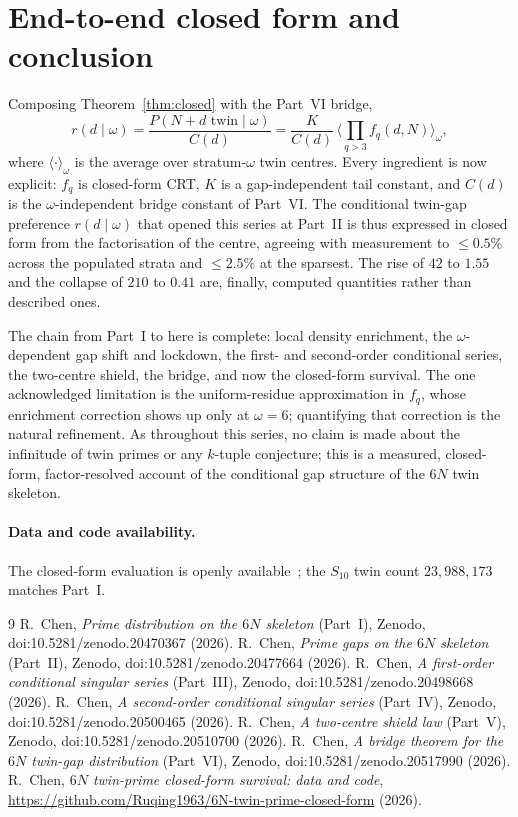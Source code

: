 \documentclass[11pt]{article}
\begin{document}
\section{End-to-end closed form and conclusion}

Composing Theorem~\ref{thm:closed} with the Part~VI bridge,
\[
  r(d\mid\omega)=\frac{P(N{+}d\text{ twin}\mid\omega)}{C(d)}
   =\frac{K}{C(d)}\,\Big\langle\textstyle\prod_{q>3} f_q(d,N)\Big\rangle_{\omega},
\]
where $\langle\cdot\rangle_\omega$ is the average over stratum-$\omega$ twin
centres. Every ingredient is now explicit: $f_q$ is closed-form CRT, $K$ is a
gap-independent tail constant, and $C(d)$ is the $\omega$-independent bridge
constant of Part~VI. The conditional twin-gap preference $r(d\mid\omega)$ that
opened this series at Part~II is thus expressed in closed form from the
factorisation of the centre, agreeing with measurement to $\leq0.5\%$ across the
populated strata and $\leq2.5\%$ at the sparsest. The rise of $42$ to $1.55$ and
the collapse of $210$ to $0.41$ are, finally, computed quantities rather than
described ones.

The chain from Part~I to here is complete: local density enrichment, the
$\omega$-dependent gap shift and lockdown, the first- and second-order
conditional series, the two-centre shield, the bridge, and now the closed-form
survival. The one acknowledged limitation is the uniform-residue approximation in
$f_q$, whose enrichment correction shows up only at $\omega=6$; quantifying that
correction is the natural refinement. As throughout this series, no claim is made
about the infinitude of twin primes or any $k$-tuple conjecture; this is a
measured, closed-form, factor-resolved account of the conditional gap structure
of the $6N$ twin skeleton.

\paragraph{Data and code availability.}
The closed-form evaluation is openly available~\cite{repo}; the $S_{10}$ twin
count $23{,}988{,}173$ matches Part~I.

\begin{thebibliography}{9}
 R.~Chen, \emph{Prime distribution on the $6N$ skeleton} (Part~I),
Zenodo, doi:10.5281/zenodo.20470367 (2026).
 R.~Chen, \emph{Prime gaps on the $6N$ skeleton} (Part~II),
Zenodo, doi:10.5281/zenodo.20477664 (2026).
 R.~Chen, \emph{A first-order conditional singular series}
(Part~III), Zenodo, doi:10.5281/zenodo.20498668 (2026).
 R.~Chen, \emph{A second-order conditional singular series}
(Part~IV), Zenodo, doi:10.5281/zenodo.20500465 (2026).
 R.~Chen, \emph{A two-centre shield law} (Part~V), Zenodo,
doi:10.5281/zenodo.20510700 (2026).
 R.~Chen, \emph{A bridge theorem for the $6N$ twin-gap
distribution} (Part~VI), Zenodo, doi:10.5281/zenodo.20517990 (2026).
 R.~Chen, \emph{$6N$ twin-prime closed-form survival: data and
code}, \url{https://github.com/Ruqing1963/6N-twin-prime-closed-form} (2026).
\end{thebibliography}
\end{document}

